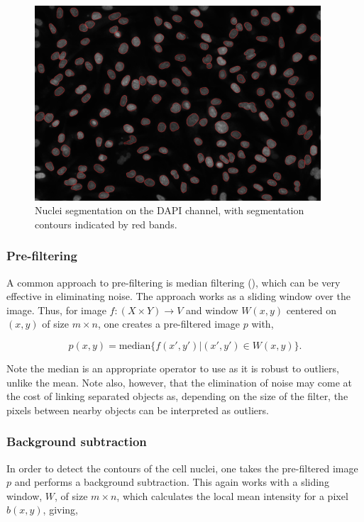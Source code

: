 \begin{figure}[ht]
\centering
\includegraphics[width=0.95\textwidth]{img/segmentation.png}
\caption{Nuclei segmentation on the DAPI channel, with segmentation contours indicated by red bands.}
\label{fig:segmentation}
\end{figure}

\subsubsection{Pre-filtering}

A common approach to pre-filtering is median filtering (\cite{huang1979fast}), which can be very effective in eliminating noise. The approach works as a sliding window over the image. Thus, for image $f: (X \times Y) \to V$ and window $W(x, y)$ centered on $(x, y)$ of size $m\times n$, one creates a pre-filtered image $p$ with,

\begin{equation}
p(x, y) = \text{median}\{f(x', y') | (x', y') \in W(x, y)\}.
\end{equation}

Note the median is an appropriate operator to use as it is robust to outliers, unlike the mean. Note also, however, that the elimination of noise may come at the cost of linking separated objects as, depending on the size of the filter, the pixels between nearby objects can be interpreted as outliers.

\subsubsection{Background subtraction}

In order to detect the contours of the cell nuclei, one takes the pre-filtered image $p$ and performs a background subtraction. This again works with a sliding window, $W$, of size $m\times n$, which calculates the local mean intensity for a pixel $b(x, y)$, giving,

